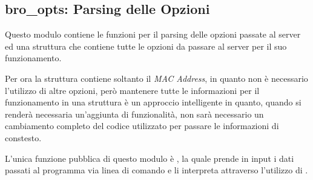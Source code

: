 \subsection[bro\_opts]{bro\_opts: Parsing delle Opzioni}
Questo modulo contiene le funzioni per il parsing delle opzioni passate al
server ed una struttura che contiene tutte le opzioni da passare al server
per il suo funzionamento.

Per ora la struttura contiene soltanto il \emph{MAC Address}, in quanto non
è necessario l'utilizzo di altre opzioni, però mantenere tutte le
informazioni per il funzionamento in una struttura è un approccio
intelligente in quanto, quando si renderà necessaria un'aggiunta di
funzionalità, non sarà necessario un cambiamento completo del codice
utilizzato per passare le informazioni di constesto.

L'unica funzione pubblica di questo modulo è \linebreak {}, la quale prende in input i dati passati
al programma via linea di comando e li interpreta attraverso l'utilizzo di
.

\cleardoublepage
